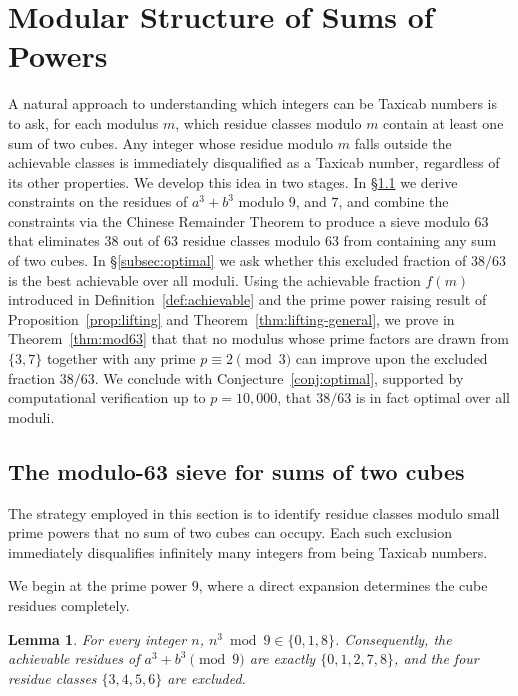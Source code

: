 \documentclass[12pt]{amsart}
\newtheorem{lemma}{Lemma}
\theoremstyle{definition}
\theoremstyle{remark}
\begin{document}
\section{Modular Structure of Sums of Powers}\label{sec:modular}
A natural approach to understanding which integers can be Taxicab numbers
is to ask, for each modulus $m$, which residue classes modulo $m$ contain
at least one sum of two cubes. Any integer whose residue modulo $m$ falls
outside the achievable classes is immediately disqualified as a Taxicab
number, regardless of its other properties. We develop this idea in two
stages. In \S\ref{subsec:mod63} we derive constraints on the residues of
$a^3 + b^3$ modulo $9$, and $7$, and combine the constraints
via the Chinese Remainder Theorem to produce a sieve
modulo $63$ that eliminates $38$ out of $63$ residue classes modulo $63$ from
containing any sum of two cubes. In \S\ref{subsec:optimal} we ask whether this excluded fraction of
$38/63$ is the best achievable over all moduli. Using the achievable
fraction $f(m)$ introduced in Definition~\ref{def:achievable} and the
prime power raising result of Proposition~\ref{prop:lifting} and
Theorem~\ref{thm:lifting-general}, we prove in Theorem~\ref{thm:mod63}
that that no modulus whose prime 
factors are drawn from $\{3, 7\}$ together with any
prime $p \equiv 2 \pmod{3}$ can improve upon the excluded fraction $38/63$. We conclude with Conjecture~\ref{conj:optimal}, supported by
computational verification up to $p = 10{,}000$, that $38/63$ is in
fact optimal over all moduli.

\subsection{The modulo-63 sieve for sums of two cubes}\label{subsec:mod63}

The strategy employed in this section is to identify residue classes modulo small
prime powers that no sum of two cubes can occupy. Each such exclusion
immediately disqualifies infinitely many integers from being Taxicab
numbers. 

We begin at the prime power $9$, where a direct expansion determines the
cube residues completely.

\begin{lemma}\label{lem:cubes-mod9}
For every integer $n$, $n^3 \bmod 9 \in \{0, 1, 8\}$. Consequently, the
achievable residues of $a^3 + b^3 \pmod{9}$ are exactly $\{0,1,2,7,8\}$,
and the four residue classes $\{3,4,5,6\}$ are excluded.
\end{lemma}
\end{document}
